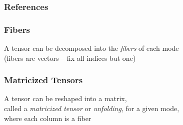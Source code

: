 \documentclass[xcolor=dvipsnames]{beamer}
\begin{document}



\begin{frame}[allowframebreaks]
\frametitle{References}
\tiny


\normalsize
\end{frame}

\begin{frame}
\frametitle{Fibers}

\begin{center}


\vfill

A tensor can be decomposed into the \emph{fibers} of each mode \\
(fibers are vectors -- fix all indices but one)

\end{center}

\end{frame}

\begin{frame}
\frametitle{Matricized Tensors}

\begin{center}


\vfill

A tensor can be reshaped into a matrix, \\ 
called a \emph{matricized tensor} or \emph{unfolding}, for a given mode, \\
where each column is a fiber

\end{center}

\end{frame}
\end{document}
